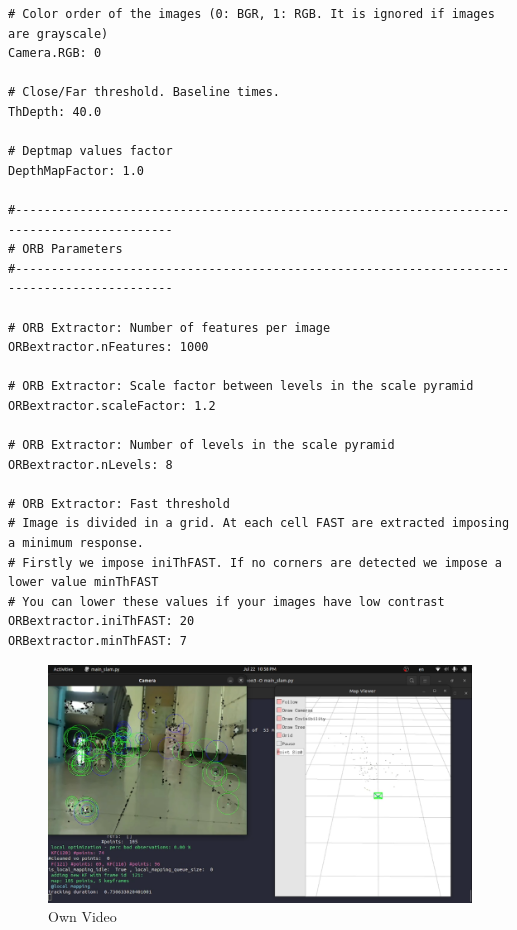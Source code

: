 \documentclass[a4paper, 12pt]{article}
\begin{document}
\begin{lstlisting}
# Color order of the images (0: BGR, 1: RGB. It is ignored if images are grayscale)
Camera.RGB: 0

# Close/Far threshold. Baseline times.
ThDepth: 40.0

# Deptmap values factor
DepthMapFactor: 1.0

#--------------------------------------------------------------------------------------------
# ORB Parameters
#--------------------------------------------------------------------------------------------

# ORB Extractor: Number of features per image
ORBextractor.nFeatures: 1000

# ORB Extractor: Scale factor between levels in the scale pyramid 	
ORBextractor.scaleFactor: 1.2

# ORB Extractor: Number of levels in the scale pyramid	
ORBextractor.nLevels: 8

# ORB Extractor: Fast threshold
# Image is divided in a grid. At each cell FAST are extracted imposing a minimum response.
# Firstly we impose iniThFAST. If no corners are detected we impose a lower value minThFAST
# You can lower these values if your images have low contrast			
ORBextractor.iniThFAST: 20
ORBextractor.minThFAST: 7
	\end{lstlisting}
	
	\begin{figure}
		\caption{Own Video}
		\includegraphics[scale=0.25]{images/own.png}
	\end{figure}
\end{document}
